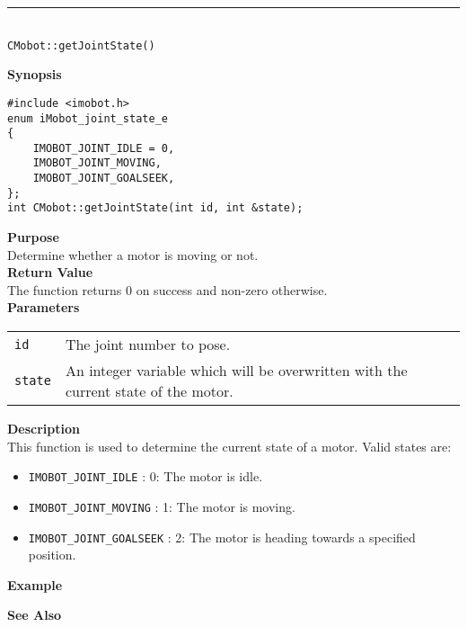 \noindent
\vspace{5pt}
\rule{4.5in}{0.015in}\\
\noindent
{\LARGE \texttt{CMobot::getJointState()}}\\
{}

\noindent
{\bf Synopsis}\\
\begin{verbatim}
#include <imobot.h>
enum iMobot_joint_state_e
{
    IMOBOT_JOINT_IDLE = 0,
    IMOBOT_JOINT_MOVING,
    IMOBOT_JOINT_GOALSEEK,
};
int CMobot::getJointState(int id, int &state);
\end{verbatim}

\noindent
{\bf Purpose}\\
Determine whether a motor is moving or not.\\

\noindent
{\bf Return Value}\\
The function returns 0 on success and non-zero otherwise.\\

\noindent
{\bf Parameters}
\vspace{-0.1in}
\begin{description}
\item               
\begin{tabular}{p{10 mm}p{145 mm}}
\texttt{id} & The joint number to pose. \\
\texttt{state} & An integer variable which will be overwritten with the current state of the motor. 
\end{tabular}
\end{description}

\noindent
{\bf Description}\\
This function is used to determine the current state of a motor. Valid states are:
\begin{itemize}
\item \texttt{IMOBOT\_JOINT\_IDLE} : 0: The motor is idle.
\item \texttt{IMOBOT\_JOINT\_MOVING} : 1: The motor is moving.
\item \texttt{IMOBOT\_JOINT\_GOALSEEK} : 2: The motor is heading towards a specified position.
\end{itemize}

\noindent
{\bf Example}\\
\noindent

\noindent
{\bf See Also}\\

